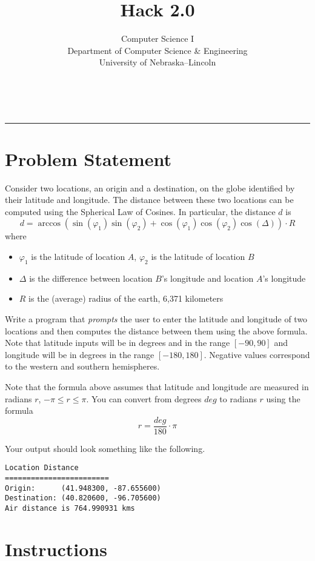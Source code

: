 \documentclass[12pt]{scrartcl}
\title{Hack 2.0}\let\Title\@title
\subtitle{Computer Science I\\
{\small
\vskip1cm
Department of Computer Science \& Engineering \\
University of Nebraska--Lincoln}
\vskip-1cm}
\date{~}
\begin{document}
\maketitle

\hrule



\section*{Problem Statement}

Consider two locations, an origin and a destination, on the globe 
identified by their latitude and longitude.  The distance between
these two locations can be computed using the Spherical Law of 
Cosines.  In particular, the distance $d$ is
 $$d = \arccos{(\sin(\varphi_1) \sin(\varphi_2) + \cos(\varphi_1) \cos(\varphi_2) \cos(\Delta) )} \cdot R$$
where
\begin{itemize}
  \item $\varphi_1$ is the latitude of location $A$, $\varphi_2$ is the latitude of location $B$
  \item $\Delta$ is the difference between location $B$'s longitude and location $A$'s longitude
  \item $R$ is the (average) radius of the earth, 6,371 kilometers
\end{itemize}

Write a program that \emph{prompts} the user to enter the latitude 
and longitude of two locations and then computes the distance between them using
the above formula.  Note that latitude inputs will be in degrees and in the
range $[-90, 90]$ and longitude will be in degrees in the range $[-180, 180]$.
Negative values correspond to the western and southern hemispheres.  

Note that the formula above assumes that latitude and longitude are 
measured in radians $r$, $-\pi \leq r \leq \pi$.  You can convert from
degrees $deg$ to radians $r$ using the formula
  $$r = \frac{deg}{180} \cdot \pi$$  

Your output should look something like the following.  

\begin{verbatim}
Location Distance
========================
Origin:      (41.948300, -87.655600)
Destination: (40.820600, -96.705600)
Air distance is 764.990931 kms
\end{verbatim}


\section*{Instructions}
\end{document}

